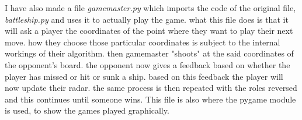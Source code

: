 \documentclass{article}
\begin{document}
	I have also made a file \textit{gamemaster.py} which imports the code of the original file, \textit{battleship.py} and uses it to actually play the game. what this file does is that it will ask a player the coordinates of the point where they want to play their next move. how they choose those particular coordinates is subject to the internal workings of their algorithm. then gamemaster "shoots" at the said coordinates of the opponent's board. the opponent now gives a feedback based on whether the player has missed or hit or sunk a ship. based on this feedback the player will now update their radar. the same process is then repeated with the roles reversed and this continues until someone wins. This file is also where the pygame module is used, to show the games played graphically.
	
\end{document}
